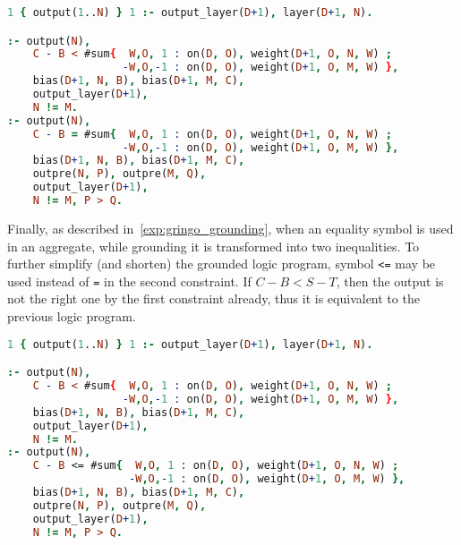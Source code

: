 \begin{lstlisting}[language=Prolog, numbers=none]
1 { output(1..N) } 1 :- output_layer(D+1), layer(D+1, N).

:- output(N),
    C - B < #sum{  W,O, 1 : on(D, O), weight(D+1, O, N, W) ;
                  -W,O,-1 : on(D, O), weight(D+1, O, M, W) },
    bias(D+1, N, B), bias(D+1, M, C),
    output_layer(D+1),
    N != M.
:- output(N),
    C - B = #sum{  W,O, 1 : on(D, O), weight(D+1, O, N, W) ;
                  -W,O,-1 : on(D, O), weight(D+1, O, M, W) },
    bias(D+1, N, B), bias(D+1, M, C),
    outpre(N, P), outpre(M, Q),
    output_layer(D+1),
    N != M, P > Q.
\end{lstlisting}

Finally, as described in~\cref{exp:gringo_grounding}, when an equality symbol is used
in an aggregate, while grounding it is transformed into two inequalities.
To further simplify (and shorten) the grounded logic program, symbol \texttt{<=}
may be used instead of \texttt{=} in the second constraint.
If $C-B < S-T$, then the output is not the right one by the first constraint already,
thus it is equivalent to the previous logic program.

\begin{lstlisting}[language=Prolog, numbers=none]
1 { output(1..N) } 1 :- output_layer(D+1), layer(D+1, N).

:- output(N),
    C - B < #sum{  W,O, 1 : on(D, O), weight(D+1, O, N, W) ;
                  -W,O,-1 : on(D, O), weight(D+1, O, M, W) },
    bias(D+1, N, B), bias(D+1, M, C),
    output_layer(D+1),
    N != M.
:- output(N),
    C - B <= #sum{  W,O, 1 : on(D, O), weight(D+1, O, N, W) ;
                   -W,O,-1 : on(D, O), weight(D+1, O, M, W) },
    bias(D+1, N, B), bias(D+1, M, C),
    outpre(N, P), outpre(M, Q),
    output_layer(D+1),
    N != M, P > Q.
\end{lstlisting}

